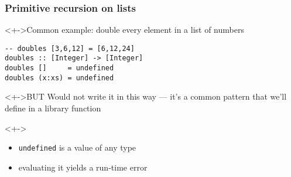 \documentclass{beamer}
\begin{document}
\begin{frame}[fragile]
  \frametitle{Primitive recursion on lists}
  \begin{block}<+->{Common example: double every element in a list of numbers}
\begin{lstlisting}
-- doubles [3,6,12] = [6,12,24]
doubles :: [Integer] -> [Integer]
doubles []     = undefined
doubles (x:xs) = undefined
\end{lstlisting}
  \end{block}
  \begin{alertblock}<+->{BUT}
    Would not write it in this way --- it's a common pattern that we'll define in a library function 
  \end{alertblock}
  \begin{alertblock}<+->{}
    \begin{itemize}
    \item \lstinline{undefined} is a value of any type
    \item evaluating it yields a run-time error
    \end{itemize}
  \end{alertblock}
\end{frame}
\end{document}
